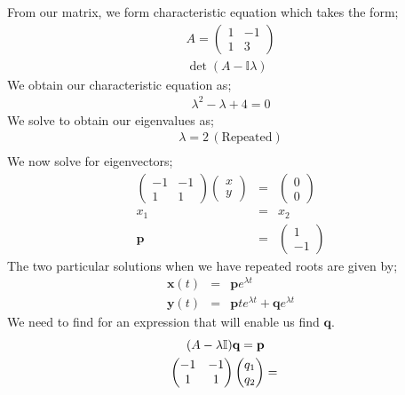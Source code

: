 \documentclass[12pt,a4paper]{article}
\begin{document}
\begin{enumerate}
From our matrix, we form characteristic equation which takes the form;
\begin{eqnarray*}
A=\begin{pmatrix}
1 & -1\\
1& 3
\end{pmatrix}\\
\det (A-\mathbb{I} \lambda)
\end{eqnarray*} 
We obtain our characteristic equation as;
\begin{eqnarray*}
\lambda^2 -\lambda +4 =0
\end{eqnarray*}
We solve to obtain our eigenvalues as;
\begin{eqnarray*}
\lambda=2 \,(\text{Repeated})\\
\end{eqnarray*}
We now solve for eigenvectors;
\begin{eqnarray*}
\begin{pmatrix}
-1 & -1\\
1& 1
\end{pmatrix}
\begin{pmatrix}
x \\
y
\end{pmatrix}&= &
\begin{pmatrix}
0 \\
0
\end{pmatrix}\\
x_1&=&x_2\\
\textbf{p}&=&
\begin{pmatrix}
1 \\
-1
\end{pmatrix}
\end{eqnarray*}
The two particular solutions when we have repeated roots  are given by;
\begin{eqnarray*}
\textbf{x}(t)&=&\textbf{p}e^{\lambda t}\\
\textbf{y}(t)&=& \textbf{p}te^{\lambda t}+\textbf{q}e^{\lambda t}
\end{eqnarray*}
We need to find for an expression that will enable us find $\textbf{q}$.
\begin{eqnarray*}
(A-\lambda \mathbb{I})\textbf{q}=\textbf{p}\\ \vspace{15mm}
\begin{pmatrix}
-1 & -1\\
1& 1
\end{pmatrix}
\begin{pmatrix}
q_1 \\
q_2
\end{pmatrix}&= &

\end{eqnarray*}
\end{enumerate}
\end{document}
